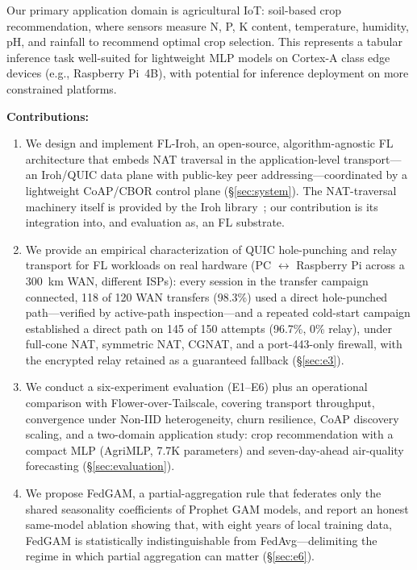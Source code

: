 \documentclass[a4paper,fleqn]{cas-dc}
\begin{document}
Our primary application domain is agricultural IoT: soil-based crop recommendation, where sensors measure N, P, K content, temperature, humidity, pH, and rainfall to recommend optimal crop selection. This represents a tabular inference task well-suited for lightweight MLP models on Cortex-A class edge devices (e.g., Raspberry Pi~4B), with potential for inference deployment on more constrained platforms.

\noindent\textbf{Contributions:}
\begin{enumerate}
    \item We design and implement FL-Iroh, an open-source, algorithm-agnostic FL architecture that embeds NAT traversal in the application-level transport---an Iroh\slash QUIC data plane with public-key peer addressing---coordinated by a lightweight CoAP\slash CBOR control plane (\S\ref{sec:system}). The NAT-traversal machinery itself is provided by the Iroh library~\cite{iroh2024}; our contribution is its integration into, and evaluation as, an FL substrate.
    \item We provide an empirical characterization of QUIC hole-punching and relay transport for FL workloads on real hardware (PC $\leftrightarrow$ Raspberry Pi across a 300~km WAN, different ISPs): every session in the transfer campaign connected, 118 of 120 WAN transfers (98.3\%) used a direct hole-punched path---verified by active-path inspection---and a repeated cold-start campaign established a direct path on 145 of 150 attempts (96.7\%, 0\% relay), under full-cone NAT, symmetric NAT, CGNAT, and a port-443-only firewall, with the encrypted relay retained as a guaranteed fallback (\S\ref{sec:e3}).
    \item We conduct a six-experiment evaluation (E1--E6) plus an operational comparison with Flower-over-Tailscale, covering transport throughput, convergence under Non-IID heterogeneity, churn resilience, CoAP discovery scaling, and a two-domain application study: crop recommendation with a compact MLP (AgriMLP, 7.7K parameters) and seven-day-ahead air-quality forecasting (\S\ref{sec:evaluation}).
    \item We propose FedGAM, a partial-aggregation rule that federates only the shared seasonality coefficients of Prophet GAM models, and report an honest same-model ablation showing that, with eight years of local training data, FedGAM is statistically indistinguishable from FedAvg---delimiting the regime in which partial aggregation can matter (\S\ref{sec:e6}).
\end{enumerate}
\end{document}
